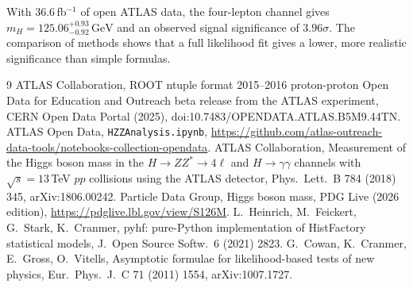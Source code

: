 \documentclass[11pt,a4paper]{article}
\newcommand{\GeV}{\,\text{GeV}}
\begin{document}
With 36.6\,fb$^{-1}$ of open ATLAS data, the four-lepton channel gives
$m_H = 125.06^{+0.93}_{-0.92}\GeV$ and an observed signal significance of $3.96\sigma$. The
comparison of methods shows that a full likelihood fit gives a lower, more realistic
significance than simple formulas.

\begin{thebibliography}{9}\small\itemsep0pt
 ATLAS Collaboration, ROOT ntuple format 2015--2016 proton-proton Open Data
for Education and Outreach beta release from the ATLAS experiment, CERN Open Data Portal
(2025), doi:10.7483/OPENDATA.ATLAS.B5M9.44TN.
 ATLAS Open Data, \texttt{HZZAnalysis.ipynb},
\url{https://github.com/atlas-outreach-data-tools/notebooks-collection-opendata}.
 ATLAS Collaboration, Measurement of the Higgs boson mass in the
$H\to ZZ^*\to4\ell$ and $H\to\gamma\gamma$ channels with $\sqrt{s}=13$\,TeV $pp$ collisions
using the ATLAS detector, Phys.\ Lett.\ B 784 (2018) 345, arXiv:1806.00242.
 Particle Data Group, Higgs boson mass, PDG Live (2026 edition),
\url{https://pdglive.lbl.gov/view/S126M}.
 L.~Heinrich, M.~Feickert, G.~Stark, K.~Cranmer, pyhf: pure-Python
implementation of HistFactory statistical models, J.\ Open Source Softw.\ 6 (2021) 2823.
 G.~Cowan, K.~Cranmer, E.~Gross, O.~Vitells, Asymptotic formulae for
likelihood-based tests of new physics, Eur.\ Phys.\ J.\ C 71 (2011) 1554, arXiv:1007.1727.
\end{thebibliography}
\end{document}
